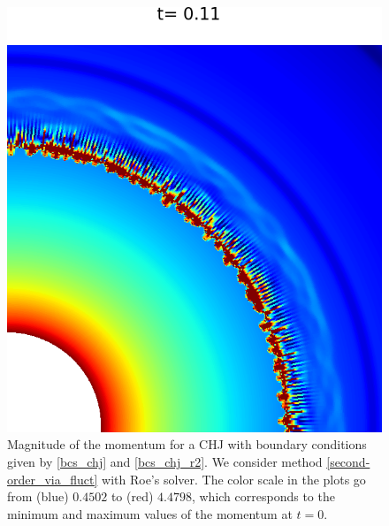 \documentclass[preprint, 11pt]{article}
\begin{document}
\begin{figure}[!h]
  \includegraphics[scale=0.28]{figures/chj_r2_roe_p3.png}
  \caption{Magnitude of the momentum for a CHJ with boundary conditions given by
    \eqref{bcs_chj} and \eqref{bcs_chj_r2}. 
    We consider method \eqref{second-order_via_fluct} with Roe's solver.
    The color scale in the plots go from (blue) $0.4502$ to (red) $4.4798$,
    which corresponds to the minimum and maximum values of the momentum at $t=0$.
    \label{fig:chj_r2}}
\end{figure}
\end{document}
